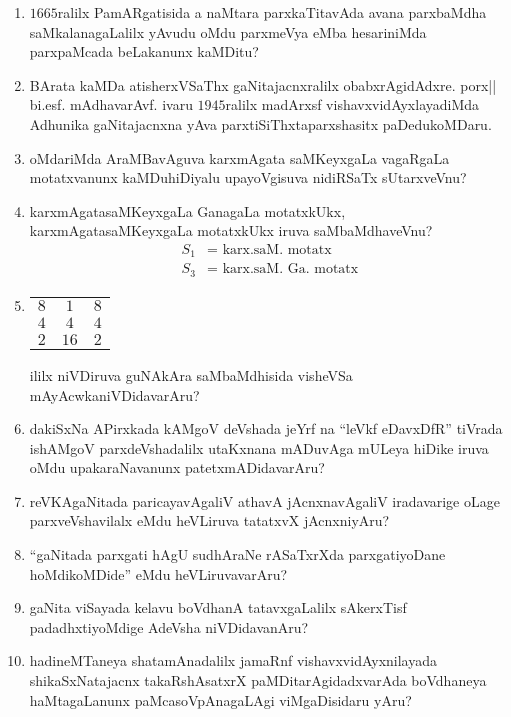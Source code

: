 \begin{enumerate}
\item $1665$ralilx PamARgatisida a naMtara parxkaTitavAda avana parxbaMdha saMkalanagaLalilx yAvudu oMdu parxmeVya eMba hesariniMda parxpaMcada beLakanunx kaMDitu?

\item BArata kaMDa atisherxVSaThx gaNitajacnxralilx obabxrAgidAdxre. porx|| bi.esf. mAdhavarAvf. ivaru $1945$ralilx madArxsf vishavxvidAyxlayadiMda Adhunika gaNitajacnxna yAva parxtiSiThxtaparxshasitx paDedukoMDaru.
  
\item oMdariMda AraMBavAguva karxmAgata saMKeyxgaLa vagaRgaLa motatxvanunx kaMDuhiDiyalu upayoVgisuva nidiRSaTx sUtarxveVnu?

  
  
\item karxmAgatasaMKeyxgaLa GanagaLa motatxkUkx, karxmAgatasaMKeyxgaLa motatxkUkx iruva saMbaMdhaveVnu?
  \begin{align*}
    S_1 & = \text{ karx.saM. motatx}\\
    S_3 & = \text{ karx.saM. Ga. motatx}
  \end{align*}
  
\item
    \begin{tabular}[t]{ccc}
    $8$&$1$&$8$\\
    $4$&$4$&$4$\\
    $2$&$16$&$2$
  \end{tabular}

  ililx niVDiruva guNAkAra saMbaMdhisida visheVSa mAyAcwka\break niVDidavarAru?
  
\item dakiSxNa APirxkada kAMgoV deVshada jeYrf na ``leVkf eDavxDfR'' tiVrada ishAMgoV parxdeVshadalilx utaKxnana mADuvAga mULeya hiDike iruva oMdu upakaraNavanunx patetxmADidavarAru?

\item reVKAgaNitada paricayavAgaliV athavA jAcnxnavAgaliV iradavarige oLage parxveVshavilalx eMdu heVLiruva tatatxvX jAcnxniyAru?

\item ``gaNitada parxgati hAgU sudhAraNe rASaTxrXda parxgatiyoDane hoMdi\-koMDide'' eMdu heVLiruvavarAru?

\item gaNita viSayada kelavu boVdhanA tatavxgaLalilx sAkerxTisf padadhxtiyoMdige AdeVsha niVDidavanAru?

\item hadineMTaneya shatamAnadalilx jamaRnf vishavxvidAyxnilayada shikaSxNatajacnx takaR\-shAsatxrX paMDitarAgidadxvarAda boVdhaneya haMtagaLanunx paMcasoVpAnagaLAgi viMgaDisidaru yAru?


\end{enumerate}
